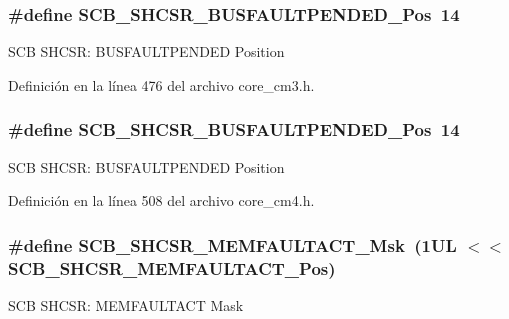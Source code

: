 \subsubsection[{\texorpdfstring{S\+C\+B\+\_\+\+S\+H\+C\+S\+R\+\_\+\+B\+U\+S\+F\+A\+U\+L\+T\+P\+E\+N\+D\+E\+D\+\_\+\+Pos}{SCB_SHCSR_BUSFAULTPENDED_Pos}}]{\setlength{\rightskip}{0pt plus 5cm}\#define S\+C\+B\+\_\+\+S\+H\+C\+S\+R\+\_\+\+B\+U\+S\+F\+A\+U\+L\+T\+P\+E\+N\+D\+E\+D\+\_\+\+Pos~14}\hypertarget{group___c_m_s_i_s___s_c_b_gaa22551e24a72b65f1e817f7ab462203b}{}\label{group___c_m_s_i_s___s_c_b_gaa22551e24a72b65f1e817f7ab462203b}
S\+CB S\+H\+C\+SR\+: B\+U\+S\+F\+A\+U\+L\+T\+P\+E\+N\+D\+ED Position 

Definición en la línea 476 del archivo core\+\_\+cm3.\+h.

\subsubsection[{\texorpdfstring{S\+C\+B\+\_\+\+S\+H\+C\+S\+R\+\_\+\+B\+U\+S\+F\+A\+U\+L\+T\+P\+E\+N\+D\+E\+D\+\_\+\+Pos}{SCB_SHCSR_BUSFAULTPENDED_Pos}}]{\setlength{\rightskip}{0pt plus 5cm}\#define S\+C\+B\+\_\+\+S\+H\+C\+S\+R\+\_\+\+B\+U\+S\+F\+A\+U\+L\+T\+P\+E\+N\+D\+E\+D\+\_\+\+Pos~14}\hypertarget{group___c_m_s_i_s___s_c_b_gaa22551e24a72b65f1e817f7ab462203b}{}\label{group___c_m_s_i_s___s_c_b_gaa22551e24a72b65f1e817f7ab462203b}
S\+CB S\+H\+C\+SR\+: B\+U\+S\+F\+A\+U\+L\+T\+P\+E\+N\+D\+ED Position 

Definición en la línea 508 del archivo core\+\_\+cm4.\+h.

\subsubsection[{\texorpdfstring{S\+C\+B\+\_\+\+S\+H\+C\+S\+R\+\_\+\+M\+E\+M\+F\+A\+U\+L\+T\+A\+C\+T\+\_\+\+Msk}{SCB_SHCSR_MEMFAULTACT_Msk}}]{\setlength{\rightskip}{0pt plus 5cm}\#define S\+C\+B\+\_\+\+S\+H\+C\+S\+R\+\_\+\+M\+E\+M\+F\+A\+U\+L\+T\+A\+C\+T\+\_\+\+Msk~(1\+U\+L $<$$<$ S\+C\+B\+\_\+\+S\+H\+C\+S\+R\+\_\+\+M\+E\+M\+F\+A\+U\+L\+T\+A\+C\+T\+\_\+\+Pos)}\hypertarget{group___c_m_s_i_s___s_c_b_ga9147fd4e1b12394ae26eadf900a023a3}{}\label{group___c_m_s_i_s___s_c_b_ga9147fd4e1b12394ae26eadf900a023a3}
S\+CB S\+H\+C\+SR\+: M\+E\+M\+F\+A\+U\+L\+T\+A\+CT Mask 


